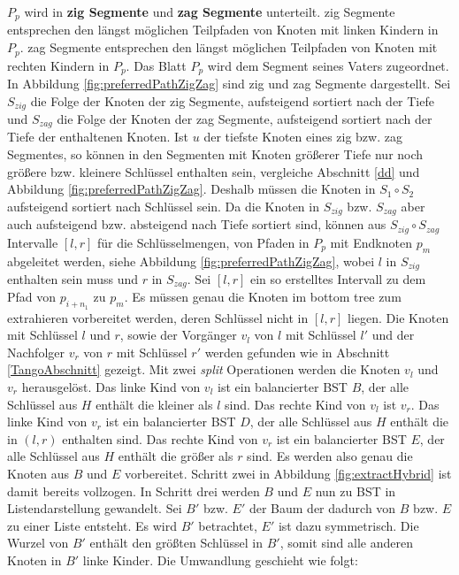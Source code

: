 \documentclass[a4paper,12pt]{article}
\begin{document}
$P_p$ wird in \textbf{zig Segmente} und \textbf{zag Segmente} unterteilt.  zig Segmente entsprechen den längst möglichen Teilpfaden von Knoten mit linken Kindern in $P_p$. zag Segmente entsprechen den längst möglichen Teilpfaden von Knoten mit rechten Kindern in $P_p$. Das Blatt $P_p$ wird dem Segment seines Vaters zugeordnet. In Abbildung  \ref{fig:preferredPathZigZag} sind zig und zag Segmente dargestellt.  Sei $S_{zig}$ die Folge der Knoten der zig Segmente, aufsteigend sortiert nach der Tiefe und $S_{zag}$ die Folge der Knoten der zag Segmente, aufsteigend sortiert nach der Tiefe der enthaltenen Knoten. Ist $u$ der tiefste Knoten eines zig bzw. zag Segmentes, so können in den Segmenten mit Knoten größerer Tiefe nur noch größere bzw. kleinere Schlüssel enthalten sein, vergleiche Abschnitt \ref{dd} und Abbildung \ref{fig:preferredPathZigZag}. Deshalb müssen die Knoten in $S_1 \circ S_2$ aufsteigend sortiert nach Schlüssel sein. Da die Knoten in $S_{zig}$ bzw. $S_{zag}$ aber auch aufsteigend bzw. absteigend nach Tiefe sortiert sind, können aus $S_{zig} \circ S_{zag}$ Intervalle $\left[l, r\right]$ für die Schlüsselmengen, von Pfaden in $P_p$ mit Endknoten $p_m$ abgeleitet werden, siehe Abbildung \ref{fig:preferredPathZigZag}, wobei $l$ in $S_{zig}$ enthalten sein muss und $r$ in $S_{zag}$.  Sei $\left[l,r\right]$ ein so erstelltes Intervall zu dem Pfad von $p_{i + {n_1}}$ zu $p_m$. Es müssen genau die Knoten im bottom tree zum extrahieren vorbereitet werden, deren Schlüssel nicht in $\left[l, r\right]$ liegen. Die Knoten mit Schlüssel $l$ und $r$, sowie der Vorgänger $v_l$ von $l$ mit Schlüssel $l'$ und der Nachfolger $v_r$ von $r$ mit Schlüssel $r'$ werden gefunden wie in Abschnitt \ref{TangoAbschnitt} gezeigt. Mit zwei \textit{split} Operationen werden die Knoten $v_l$ und $v_r$ herausgelöst. Das linke Kind von $v_l$ ist ein balancierter BST $B$, der alle Schlüssel aus $H$ enthält die kleiner als $l$ sind. Das rechte Kind von $v_l$ ist $v_r$. Das linke Kind von $v_r$ ist ein balancierter BST $D$, der alle Schlüssel aus $H$ enthält die in $\left(l, r\right)$ enthalten sind.  Das rechte  Kind von $v_r$ ist ein balancierter BST $E$, der alle Schlüssel aus $H$ enthält die größer als $r$ sind. Es werden also genau die Knoten aus $B$ und $E$ vorbereitet. Schritt zwei in Abbildung \ref{fig:extractHybrid} ist damit bereits vollzogen. In Schritt drei werden $B$ und $E$ nun zu BST in Listendarstellung gewandelt. Sei $B'$ bzw. $E'$ der Baum der dadurch von $B$ bzw. $E$ zu einer Liste entsteht. Es wird $B'$ betrachtet, $E'$ ist dazu symmetrisch.  Die Wurzel von $B'$ enthält den größten Schlüssel in $B'$, somit sind alle anderen Knoten in $B'$ linke Kinder. Die Umwandlung geschieht wie folgt:\\
\end{document}
